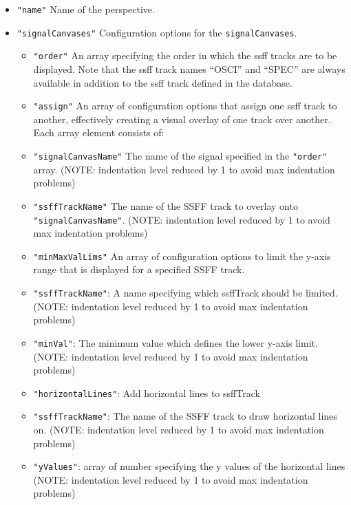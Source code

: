 \documentclass[
]{book}
\begin{document}
\begin{itemize}
\begin{itemize}
    \begin{itemize}
    \item
      \texttt{"name"} Name of the perspective.
    \item
      \texttt{"signalCanvases"} Configuration options for the
      \texttt{signalCanvases}.

      \begin{itemize}
      \item
        \texttt{"order"} An array specifying the order in which the
        {ssff} tracks are to be
        displayed. Note that the {ssff} track names ``OSCI'' and
        ``SPEC'' are always available in addition to the
        {ssff} track defined in the
        database.
      \item
        \texttt{"assign"} An array of configuration options that assign
        one {ssff} track to another,
        effectively creating a visual overlay of one track over
        another. Each array element consists of:
      \item
        \texttt{"signalCanvasName"} The name of the signal specified in the \texttt{"order"} array. (NOTE: indentation level reduced by 1 to avoid max indentation problems)
      \item
        \texttt{"ssffTrackName"} The name of the SSFF track to overlay onto \texttt{"signalCanvasName"}. (NOTE: indentation level reduced by 1 to avoid max indentation problems)
      \item
        \texttt{"minMaxValLims"} An array of configuration options to limit the y-axis range that is displayed for a specified SSFF track.
      \item
        \texttt{"ssffTrackName"}: A name specifying which ssffTrack should be limited. (NOTE: indentation level reduced by 1 to avoid max indentation problems)
      \item
        \texttt{"minVal"}: The minimum value which defines the lower y-axis limit. (NOTE: indentation level reduced by 1 to avoid max indentation problems)
      \item
        \texttt{"horizontalLines"}: Add horizontal lines to ssffTrack
      \item
        \texttt{"ssffTrackName"}: The name of the SSFF track to draw horizontal lines on. (NOTE: indentation level reduced by 1 to avoid max indentation problems)
      \item
        \texttt{"yValues"}: array of number specifying the y values of the horizontal lines (NOTE: indentation level reduced by 1 to avoid max indentation problems)

\end{itemize}
\end{itemize}
\end{itemize}
\end{itemize}
\end{document}
